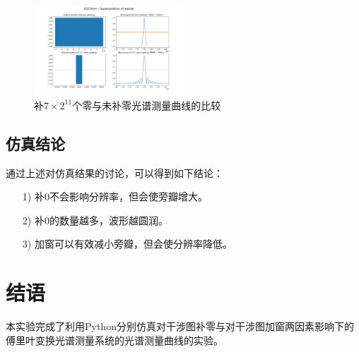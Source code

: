 \documentclass[conference]{IEEEtran}
\begin{document}
\begin{figure}[htbp]
    \centerline{\includegraphics[width=0.5\textwidth]{pic3.png}}
    \caption{补$7\times2^{11}$个零与未补零光谱测量曲线的比较}
    \label{pic3}
\end{figure}

\subsection{仿真结论}
通过上述对仿真结果的讨论，可以得到如下结论：
\begin{itemize}
    \item[1)] 补0不会影响分辨率，但会使旁瓣增大。
    \item[2)] 补0的数量越多，波形越圆润。
    \item[3)] 加窗可以有效减小旁瓣，但会使分辨率降低。
\end{itemize}



\section{结语}
本实验完成了利用Python分别仿真对干涉图补零与对干涉图加窗两因素影响下的傅里叶变换光谱测量系统的光谱测量曲线的实验。
\end{document}
